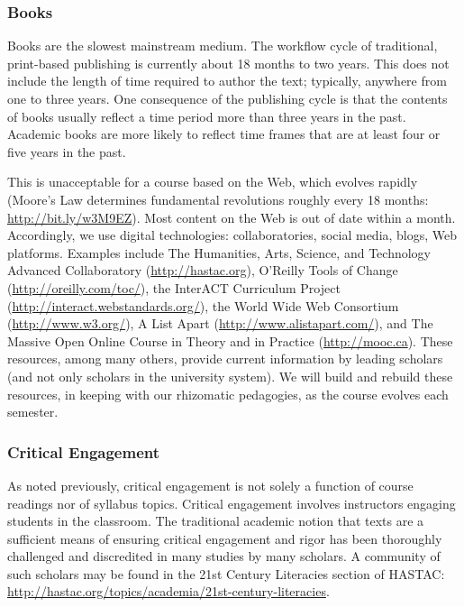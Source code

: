 \documentclass[letterpaper,10pt,headsepline]{scrreprt}
\begin{document}
\subsubsection{Books}

Books are the slowest mainstream medium. The workflow cycle of traditional, print-based publishing is currently about 18 months to two years. This does not include the length of time required to author the text; typically, anywhere from one to three years. One consequence of the publishing cycle is that the contents of books usually reflect a time period more than three years in the past. Academic books are more likely to reflect time frames that are at least four or five years in the past.

This is unacceptable for a course based on the Web, which evolves rapidly (Moore's Law determines fundamental revolutions roughly every 18 months: \url{http://bit.ly/w3M9EZ}). Most content on the Web is out of date within a month. Accordingly, we use digital technologies: collaboratories, social media, blogs, Web platforms. Examples include The Humanities, Arts, Science, and Technology Advanced Collaboratory (\url{http://hastac.org}), O'Reilly Tools of Change (\url{http://oreilly.com/toc/}), the InterACT Curriculum Project (\url{http://interact.webstandards.org/}), the World Wide Web Consortium (\url{http://www.w3.org/}), A List Apart (\url{http://www.alistapart.com/}), and The Massive Open Online Course in Theory and in Practice (\url{http://mooc.ca}). These resources, among many others, provide current information by leading scholars (and not only scholars in the university system). We will build and rebuild these resources, in keeping with our rhizomatic pedagogies, as the course evolves each semester.

\subsubsection{Critical Engagement}

As noted previously, critical engagement is not solely a function of course readings nor of syllabus topics. Critical engagement involves instructors engaging students in the classroom. The traditional academic notion that texts are a sufficient means of ensuring critical engagement and rigor has been thoroughly challenged and discredited in many studies by many scholars. A community of such scholars may be found in the 21st Century Literacies section of HASTAC: \url{http://hastac.org/topics/academia/21st-century-literacies}.
\end{document}
